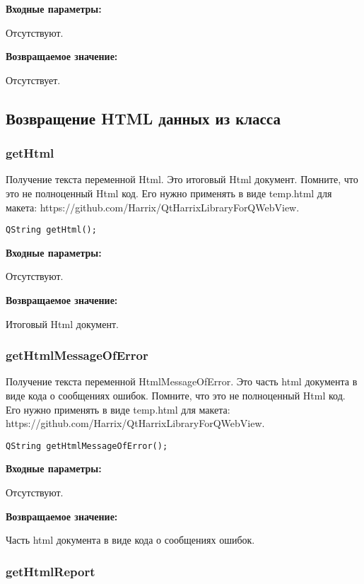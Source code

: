 \documentclass[a4paper,12pt]{article}
\begin{document}
\textbf{Входные параметры:}

Отсутствуют.

\textbf{Возвращаемое значение:}

Отсутствует.


\subsection{Возвращение HTML данных из класса}

\subsubsection{getHtml}\label{getHtml}

Получение текста переменной Html. Это итоговый Html документ. Помните, что это не полноценный Html код. Его нужно применять в виде temp.html для макета:      https://github.com/Harrix/QtHarrixLibraryForQWebView.


\begin{lstlisting}[label=code_syntax_getHtml,caption=Синтаксис]
QString getHtml();
\end{lstlisting}

\textbf{Входные параметры:}

Отсутствуют.

\textbf{Возвращаемое значение:}

Итоговый Html документ.


\subsubsection{getHtmlMessageOfError}\label{getHtmlMessageOfError}

Получение текста переменной HtmlMessageOfError. Это часть html документа в виде кода о сообщениях ошибок. Помните, что это не полноценный Html код. Его нужно применять в виде temp.html для макета: https://github.com/Harrix/QtHarrixLibraryForQWebView.


\begin{lstlisting}[label=code_syntax_getHtmlMessageOfError,caption=Синтаксис]
QString getHtmlMessageOfError();
\end{lstlisting}

\textbf{Входные параметры:}

Отсутствуют.

\textbf{Возвращаемое значение:}

Часть html документа в виде кода о сообщениях ошибок.


\subsubsection{getHtmlReport}\label{getHtmlReport}
\end{document}
